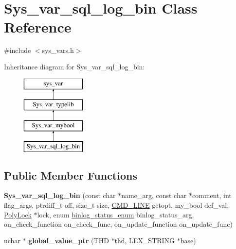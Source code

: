 \hypertarget{classSys__var__sql__log__bin}{}\section{Sys\+\_\+var\+\_\+sql\+\_\+log\+\_\+bin Class Reference}
\label{classSys__var__sql__log__bin}


{\ttfamily \#include $<$sys\+\_\+vars.\+h$>$}

Inheritance diagram for Sys\+\_\+var\+\_\+sql\+\_\+log\+\_\+bin\+:\begin{figure}[H]
\begin{center}
\leavevmode
\includegraphics[height=4.000000cm]{classSys__var__sql__log__bin}
\end{center}
\end{figure}
\subsection*{Public Member Functions}
\begin{DoxyCompactItemize}
\item 
\mbox{\label{classSys__var__sql__log__bin_af349b1ac4f49750388054f80460a642f}} 
{\bfseries Sys\+\_\+var\+\_\+sql\+\_\+log\+\_\+bin} (const char $\ast$name\+\_\+arg, const char $\ast$comment, int flag\+\_\+args, ptrdiff\+\_\+t off, size\+\_\+t size, \mbox{\hyperlink{structCMD__LINE}{C\+M\+D\+\_\+\+L\+I\+NE}} getopt, my\+\_\+bool def\+\_\+val, \mbox{\hyperlink{classPolyLock}{Poly\+Lock}} $\ast$lock, enum \mbox{\hyperlink{classsys__var_a664520ec82191888717c86085bfa83ce}{binlog\+\_\+status\+\_\+enum}} binlog\+\_\+status\+\_\+arg, on\+\_\+check\+\_\+function on\+\_\+check\+\_\+func, on\+\_\+update\+\_\+function on\+\_\+update\+\_\+func)
\item 
\mbox{\label{classSys__var__sql__log__bin_aaa4647a562cccf239d40c43de562b5ff}} 
uchar $\ast$ {\bfseries global\+\_\+value\+\_\+ptr} (T\+HD $\ast$thd, L\+E\+X\+\_\+\+S\+T\+R\+I\+NG $\ast$base)
\end{DoxyCompactItemize}
